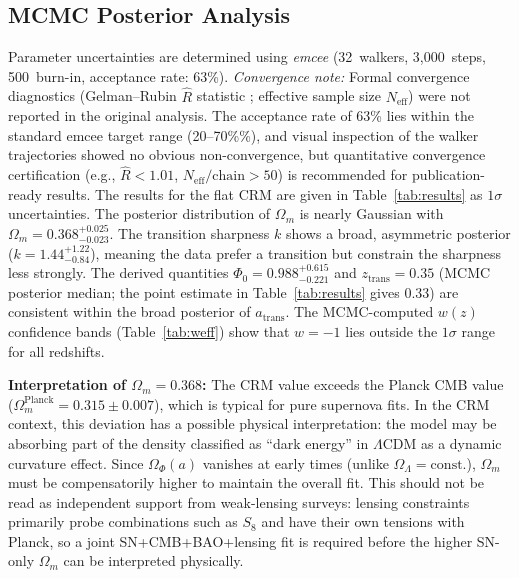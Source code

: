 \documentclass[aps,prd,twocolumn,superscriptaddress,nofootinbib]{revtex4-2}
\begin{document}
\subsection{MCMC Posterior Analysis}
\label{subsec:mcmc}

Parameter uncertainties are determined using \textit{emcee} \cite{ForemanMackey2013} (32~walkers, 3,000~steps, 500~burn-in, acceptance rate: 63\%). \textit{Convergence note:} Formal convergence diagnostics (Gelman--Rubin $\hat{R}$ statistic \cite{GelmanRubin1992}; effective sample size $N_\mathrm{eff}$) were not reported in the original analysis. The acceptance rate of 63\% lies within the standard emcee target range (20--70\%\thinspace\%), and visual inspection of the walker trajectories showed no obvious non-convergence, but quantitative convergence certification (e.g., $\hat{R} < 1.01$, $N_\mathrm{eff}/\mathrm{chain} > 50$) is recommended for publication-ready results. The results for the flat CRM are given in Table~\ref{tab:results} as $1\sigma$ uncertainties. The posterior distribution of $\Omega_m$ is nearly Gaussian with $\Omega_m = 0.368^{+0.025}_{-0.023}$. The transition sharpness $k$ shows a broad, asymmetric posterior ($k = 1.44^{+1.22}_{-0.84}$), meaning the data prefer a transition but constrain the sharpness less strongly. The derived quantities $\Phi_0 = 0.988^{+0.615}_{-0.221}$ and $z_{\mathrm{trans}} = 0.35$ (MCMC posterior median; the point estimate in Table~\ref{tab:results} gives $0.33$) are consistent within the broad posterior of $a_{\mathrm{trans}}$. The MCMC-computed $w(z)$ confidence bands (Table~\ref{tab:weff}) show that $w = -1$ lies outside the $1\sigma$ range for all redshifts.

\textbf{Interpretation of $\Omega_m = 0.368$:} The CRM value exceeds the Planck CMB value ($\Omega_m^{\mathrm{Planck}} = 0.315 \pm 0.007$), which is typical for pure supernova fits. In the CRM context, this deviation has a possible physical interpretation: the model may be absorbing part of the density classified as ``dark energy'' in $\Lambda$CDM as a dynamic curvature effect. Since $\Omega_\Phi(a)$ vanishes at early times (unlike $\Omega_\Lambda = \mathrm{const.}$), $\Omega_m$ must be compensatorily higher to maintain the overall fit. This should not be read as independent support from weak-lensing surveys: lensing constraints primarily probe combinations such as $S_8$ and have their own tensions with Planck, so a joint SN+CMB+BAO+lensing fit is required before the higher SN-only $\Omega_m$ can be interpreted physically.
\end{document}
